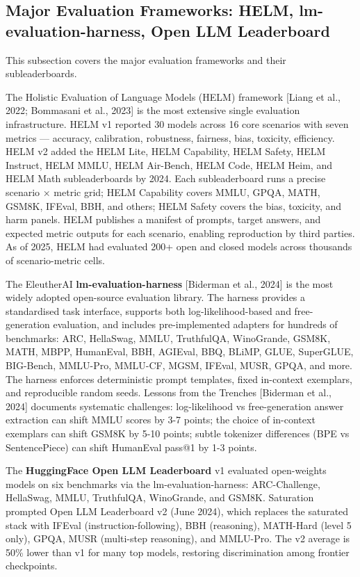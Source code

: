 \subsection{Major Evaluation Frameworks: HELM, lm-evaluation-harness, Open LLM Leaderboard}\label{major-evaluation-frameworks-helm-lm-evaluation-harness-open-llm-leaderboard}

This subsection covers the major evaluation frameworks and their subleaderboards.

The Holistic Evaluation of Language Models (HELM) framework {[}Liang et al., 2022; Bommasani et al., 2023{]} is the most extensive single evaluation infrastructure. HELM v1 reported 30 models across 16 core scenarios with seven metrics --- accuracy, calibration, robustness, fairness, bias, toxicity, efficiency. HELM v2 added the HELM Lite, HELM Capability, HELM Safety, HELM Instruct, HELM MMLU, HELM Air-Bench, HELM Code, HELM Heim, and HELM Math subleaderboards by 2024. Each subleaderboard runs a precise scenario × metric grid; HELM Capability covers MMLU, GPQA, MATH, GSM8K, IFEval, BBH, and others; HELM Safety covers the bias, toxicity, and harm panels. HELM publishes a manifest of prompts, target answers, and expected metric outputs for each scenario, enabling reproduction by third parties. As of 2025, HELM had evaluated 200+ open and closed models across thousands of scenario-metric cells.

The EleutherAI \textbf{lm-evaluation-harness} {[}Biderman et al., 2024{]} is the most widely adopted open-source evaluation library. The harness provides a standardised task interface, supports both log-likelihood-based and free-generation evaluation, and includes pre-implemented adapters for hundreds of benchmarks: ARC, HellaSwag, MMLU, TruthfulQA, WinoGrande, GSM8K, MATH, MBPP, HumanEval, BBH, AGIEval, BBQ, BLiMP, GLUE, SuperGLUE, BIG-Bench, MMLU-Pro, MMLU-CF, MGSM, IFEval, MUSR, GPQA, and more. The harness enforces deterministic prompt templates, fixed in-context exemplars, and reproducible random seeds. Lessons from the Trenches {[}Biderman et al., 2024{]} documents systematic challenges: log-likelihood vs free-generation answer extraction can shift MMLU scores by 3-7 points; the choice of in-context exemplars can shift GSM8K by 5-10 points; subtle tokenizer differences (BPE vs SentencePiece) can shift HumanEval pass@1 by 1-3 points.

The \textbf{HuggingFace Open LLM Leaderboard} v1 evaluated open-weights models on six benchmarks via the lm-evaluation-harness: ARC-Challenge, HellaSwag, MMLU, TruthfulQA, WinoGrande, and GSM8K. Saturation prompted Open LLM Leaderboard v2 (June 2024), which replaces the saturated stack with IFEval (instruction-following), BBH (reasoning), MATH-Hard (level 5 only), GPQA, MUSR (multi-step reasoning), and MMLU-Pro. The v2 average is 50\% lower than v1 for many top models, restoring discrimination among frontier checkpoints.

